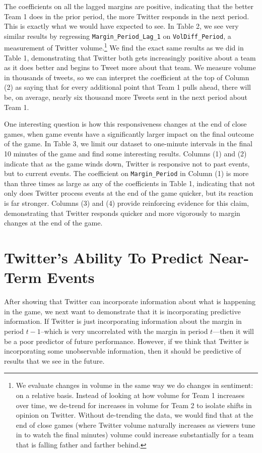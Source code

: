 \documentclass[12pt]{article}
\begin{document}
\begin{doublespacing}
The coefficients on all the lagged margins are positive, indicating that the better Team 1 does in the prior period, the more Twitter responds in the next period. This is exactly what we would have expected to see. In Table 2, we see very similar results by regressing \texttt{Margin\_Period\_Lag\_1} on \texttt{VolDiff\_Period}, a measurement of Twitter volume.\footnote{We evaluate changes in volume in the same way we do changes in sentiment: on a relative basis. Instead of looking at how volume for Team 1 increases over time, we de-trend for increases in volume for Team 2 to isolate shifts in opinion on Twitter. Without de-trending the data, we would find that at the end of close games (where Twitter volume naturally increases as viewers tune in to watch the final minutes) volume could increase substantially for a team that is falling father and farther behind.} We find the exact same results as we did in Table 1, demonstrating that Twitter both gets increasingly positive about a team as it does better and begins to Tweet more about that team. We measure volume in thousands of tweets, so we can interpret the coefficient at the top of Column (2) as saying that for every additional point that Team 1 pulls ahead, there will be, on average, nearly six thousand more Tweets sent in the next period about Team 1. 

One interesting question is how this responsiveness changes at the end of close games, when game events have a significantly larger impact on the final outcome of the game. In Table 3, we limit our dataset to one-minute intervals in the final 10 minutes of the game and find some interesting results. Columns (1) and (2) indicate that as the game winds down, Twitter is responsive not to past events, but to current events. The coefficient on \texttt{Margin\_Period} in Column (1) is more than three times as large as any of the coefficients in Table 1, indicating that not only does Twitter process events at the end of the game quicker, but its reaction is far stronger. Columns (3) and (4) provide reinforcing evidence for this claim, demonstrating that Twitter responds quicker and more vigorously to margin changes at the end of the game. 

\section*{Twitter's Ability To Predict Near-Term Events}

After showing that Twitter can incorporate information about what is happening in the game, we next want to demonstrate that it is incorporating predictive information. If Twitter is just incorporating information about the margin in period $t-1$--which is very uncorrelated with the margin in period $t$---then it will be a poor predictor of future performance. However, if we think that Twitter is incorporating some unobservable information, then it should be predictive of results that we see in the future. 


\end{doublespacing}
\end{document}

